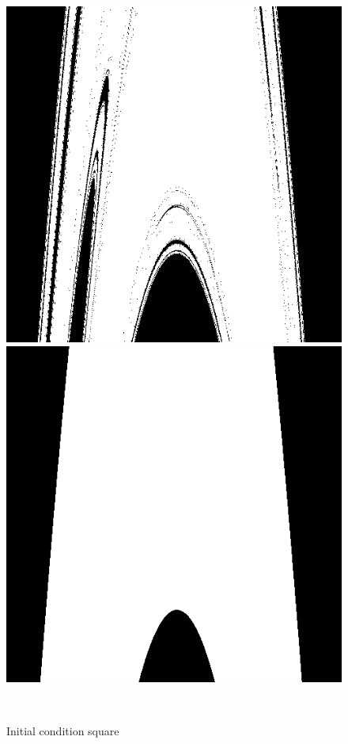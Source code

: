 \documentclass[12pt]{article}
\theoremstyle{plain}
\begin{document}
\begin{figure}[H]
\begin{minipage}[c][0.24\width]{0.24\textwidth}
\end{minipage}
\begin{minipage}[c][0.24\width]{0.24\textwidth}
   \centering
   \includegraphics[width=\textwidth]{figure/section2/Henon-orbit-1*4--0*3.png}
\end{minipage}
\begin{minipage}[c][0.24\width]{0.24\textwidth}
   \centering
   \includegraphics[width=\textwidth]{figure/section2/Henon-orbit-1*28--0*3.png}
\end{minipage}
\\[6ex]\caption{Initial condition square}\label{Initial-condition-square}
\end{figure}
\end{document}
